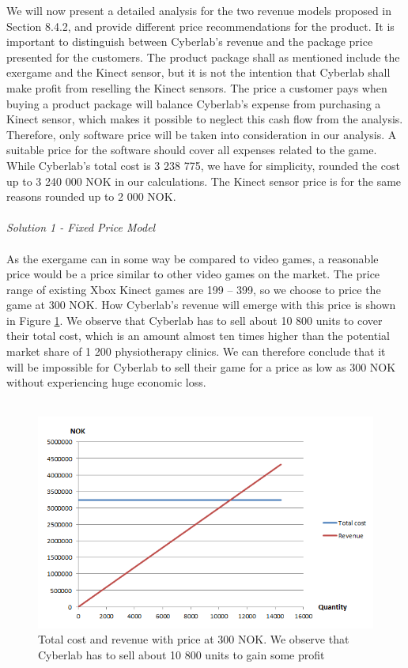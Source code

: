 We will now present a detailed analysis for the two revenue models proposed in Section 8.4.2, and provide different price recommendations for the product. It is important to distinguish between Cyberlab's revenue and the package price presented for the customers. The product package shall as mentioned include the exergame and the Kinect sensor, but it is not the intention that Cyberlab shall make profit from reselling the Kinect sensors. The price a customer pays when buying a product package will balance Cyberlab's expense from purchasing a Kinect sensor, which makes it possible to neglect this cash flow from the analysis. Therefore, only software price will be taken into consideration in our analysis. A suitable price for the software should cover all expenses related to the game. While Cyberlab's total cost is 3 238 775, we have for simplicity,  rounded the cost up to 3 240 000 NOK in our calculations. The Kinect sensor price is for the same reasons rounded up to 2 000 NOK. \\ \\ 
\emph{Solution 1 - Fixed Price Model}\\ \\
As the exergame can in some way be compared to video games, a reasonable price would be a price similar to other video games on the market. The price range of existing Xbox Kinect games are 199 – 399, so we choose to price the game at 300 NOK. How Cyberlab’s revenue will emerge with this price is shown in Figure \ref{fig:FixedLowPrice}. We observe that Cyberlab has to sell about 10 800 units to cover their total cost, which is an amount almost ten times higher than the potential market share of 1 200 physiotherapy clinics. We can therefore conclude that it will be impossible for Cyberlab to sell their game for a price as low as 300 NOK without experiencing huge economic loss.\\ \\
\begin{figure}
\begin{center}
\includegraphics[scale=0.7]{fixedlowprice}
\caption[Price related to commercial video games]{Total cost and revenue with price at 300 NOK. We observe that Cyberlab has to sell about 10 800 units to gain some profit}
\label{fig:FixedLowPrice}
\end{center}
\end{figure}
